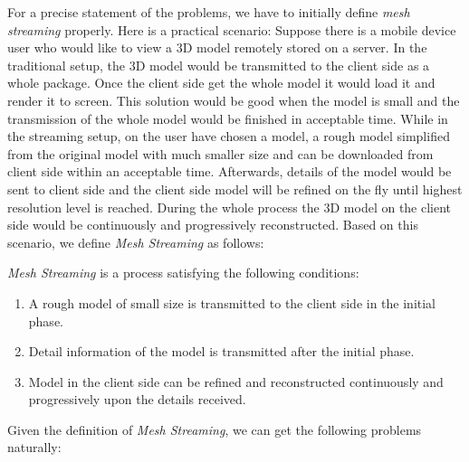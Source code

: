 For a precise statement of the problems, we have to initially define \emph{mesh streaming} properly. Here is a practical scenario: Suppose there is a mobile device user who would like to view a 3D model remotely stored on a server. In the traditional setup, the 3D model would be transmitted to the client side as a whole package. Once the client side get the whole model it would load it and render it to screen. This solution would be good when the model is small and the transmission of the whole model would be finished in acceptable time. While in the streaming setup, on the user have chosen a model, a rough model simplified from the original model with much smaller size and can be downloaded from client side within an acceptable time. Afterwards, details of the model would be sent to client side and the client side model will be refined on the fly until highest resolution level is reached. During the whole process the 3D model on the client side would be continuously and progressively reconstructed. Based on this scenario, we define \emph{Mesh Streaming} as follows: 
\begin{defn}
\emph{Mesh Streaming} is a process satisfying the following conditions: 
	\begin{enumerate}[label=\roman*]
		\item A rough model of small size is transmitted to the client side in the initial phase.
	  	\item Detail information of the model is transmitted after the initial phase. 
	  	\item Model in the client side can be refined and reconstructed continuously and progressively upon the details received. 
	\end{enumerate}
\end{defn}
Given the definition of \emph{Mesh Streaming}, we can get the following problems naturally: 
